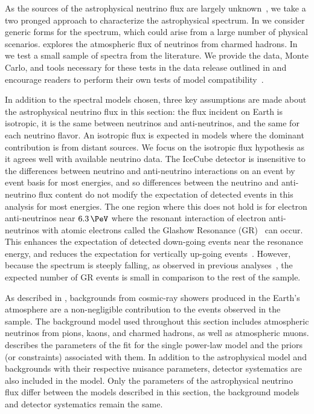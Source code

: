 As the sources of the astrophysical neutrino flux are largely unknown~\cite{Albert:2017ohr,Aartsen:2018ywr,Aartsen:2019epb}, we take a two pronged approach to characterize the astrophysical spectrum.
In  we consider generic forms for the spectrum, which could arise from a large number of physical scenarios.
 explores the atmospheric flux of neutrinos from charmed hadrons.
In  we test a small sample of spectra from the literature.
We provide the data, Monte Carlo, and tools necessary for these tests in the data release outlined in  and encourage readers to perform their own tests of model compatibility~\cite{HESE:datarelease}.

In addition to the spectral models chosen, three key assumptions are made about the astrophysical neutrino flux in this section: the flux incident on Earth is isotropic, it is the same between neutrinos and anti-neutrinos, and the same for each neutrino flavor.
An isotropic flux is expected in models where the dominant contribution is from distant sources.
We focus on the isotropic flux hypothesis as it agrees well with available neutrino data.%
The IceCube detector is insensitive to the differences between neutrino and anti-neutrino interactions on an event by event basis for most energies, and so differences between the neutrino and anti-neutrino flux content do not modify the expectation of detected events in this analysis for most energies.
The one region where this does not hold is for electron anti-neutrinos near $\SI{6.3}\PeV$ where the resonant interaction of electron anti-neutrinos with atomic electrons called the Glashow Resonance (GR)~\cite{Glashow:1960zz,Loewy:2014zva} can occur.
This enhances the expectation of detected down-going events near the resonance energy, and reduces the expectation for vertically up-going events~\cite{Barger:2014iua}.
However, because the spectrum is steeply falling, as observed in previous analyses~\cite{Aartsen:2016xlq,Aartsen:2014gkd}, the expected number of GR events is small in comparison to the rest of the sample.

As described in , backgrounds from cosmic-ray showers produced in the Earth's atmosphere are a non-negligible contribution to the events observed in the sample.
The background model used throughout this section includes atmospheric neutrinos from pions, kaons, and charmed hadrons, as well as atmospheric muons.
 describes the parameters of the fit for the single power-law model and the priors (or constraints) associated with them.
In addition to the astrophysical model and backgrounds with their respective nuisance parameters, detector systematics are also included in the model.
Only the parameters of the astrophysical neutrino flux differ between the models described in this section, the background models and detector systematics remain the same.

